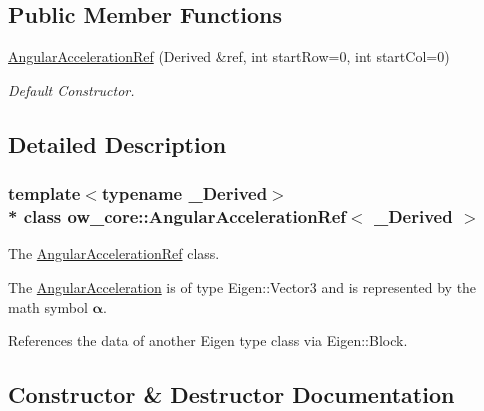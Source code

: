 \subsection*{Public Member Functions}
\begin{DoxyCompactItemize}
\item 
\hyperlink{classow__core_1_1AngularAccelerationRef_a5ce015bd30ab9300d7e8255568eb3287}{Angular\+Acceleration\+Ref} (Derived \&ref, int start\+Row=0, int start\+Col=0)
\begin{DoxyCompactList}\small\item\em Default Constructor. \end{DoxyCompactList}\end{DoxyCompactItemize}


\subsection{Detailed Description}
\subsubsection*{template$<$typename \+\_\+\+Derived$>$\\*
class ow\+\_\+core\+::\+Angular\+Acceleration\+Ref$<$ \+\_\+\+Derived $>$}

The \hyperlink{classow__core_1_1AngularAccelerationRef}{Angular\+Acceleration\+Ref} class. 

The \hyperlink{classow__core_1_1AngularAcceleration}{Angular\+Acceleration} is of type Eigen\+::\+Vector3 and is represented by the math symbol $\mathbf{\alpha}$.

References the data of another Eigen type class via Eigen\+::\+Block. 

\subsection{Constructor \& Destructor Documentation}

